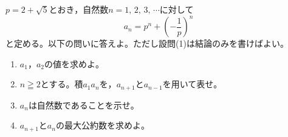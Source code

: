\documentclass[../../main.tex]{subfiles}
\begin{document}
$p=2+\sqrt5$とおき，自然数$n=1, \, 2, \, 3, \, \cdots$に対して
\[ a_n=p^n+ { \left( -\frac{1}{p} \right) }^n \]
と定める。以下の問いに答えよ。ただし設問(1)は結論のみを書けばよい。
\begin{enumerate}
  \item$a_1$，$a_2$の値を求めよ。
  \item$n\geqq2$とする。積$a_1a_n$を，$a_{n+1}$と$a_{n-1}$を用いて表せ。
  \item$a_n$は自然数であることを示せ。
  \item$a_{n+1}$と$a_n$の最大公約数を求めよ。
\end{enumerate}
\end{document}
